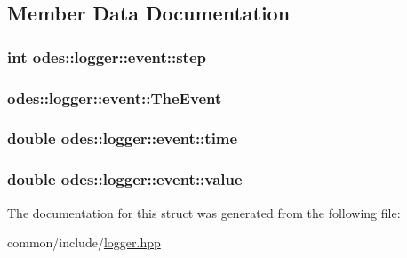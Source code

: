 \subsection{Member Data Documentation}
\hypertarget{structodes_1_1logger_1_1event_ac8ce173f875f3c79148b56f659310a19}{}
\subsubsection[{step}]{\setlength{\rightskip}{0pt plus 5cm}int odes\+::logger\+::event\+::step}\label{structodes_1_1logger_1_1event_ac8ce173f875f3c79148b56f659310a19}
\hypertarget{structodes_1_1logger_1_1event_a788c846b1f2e2cb2fa04bd09cd1a5dcf}{}
\subsubsection[{The\+Event}]{ odes\+::logger\+::event\+::\+The\+Event}\label{structodes_1_1logger_1_1event_a788c846b1f2e2cb2fa04bd09cd1a5dcf}
\hypertarget{structodes_1_1logger_1_1event_acf7ad37303c62a3d0a8b861dfa22ef20}{}
\subsubsection[{time}]{\setlength{\rightskip}{0pt plus 5cm}double odes\+::logger\+::event\+::time}\label{structodes_1_1logger_1_1event_acf7ad37303c62a3d0a8b861dfa22ef20}
\hypertarget{structodes_1_1logger_1_1event_a28617fe70b6c59730b009f19ffbf2f7a}{}
\subsubsection[{value}]{\setlength{\rightskip}{0pt plus 5cm}double odes\+::logger\+::event\+::value}\label{structodes_1_1logger_1_1event_a28617fe70b6c59730b009f19ffbf2f7a}


The documentation for this struct was generated from the following file\+:\begin{DoxyCompactItemize}
\item 
common/include/\hyperlink{logger_8hpp}{logger.\+hpp}\end{DoxyCompactItemize}
